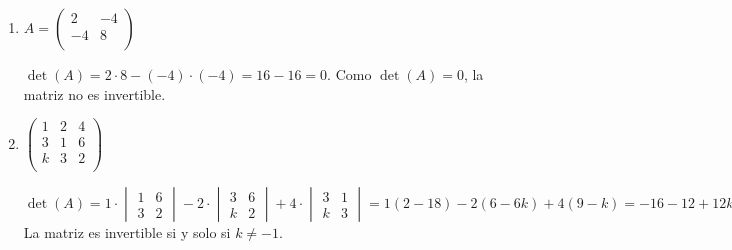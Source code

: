 \begin{prob}
\begin{enumerate}[$a)$]
\begin{myproof}
Por lo tanto:
$A^{-1} = \left( \begin{array}{cccc}
8&3&-5&-1\\
\frac{3}{2}&0&-1&0\\
\frac{1}{2}&0&0&0\\
-8&-2&5&1\\
\end{array} \right)$
 
\end{myproof}

\item $A=\left( \begin{array}{cc}
2&-4\\
-4&8\\
\end{array} \right)$
\begin{myproof} $\det(A) = 2 \cdot 8 - (-4) \cdot (-4) = 16 - 16 = 0.$ Como $\det(A) = 0$, la matriz no es invertible.
\end{myproof}

\item $\left( \begin{array}{ccc}
1&2&4\\
3&1&6\\
k&3&2\\\end{array} \right)$ 

\begin{myproof}

$\det(A) = 1 \cdot \begin{vmatrix} 1&6\\3&2 \end{vmatrix} - 2 \cdot \begin{vmatrix} 3&6\\k&2 \end{vmatrix} + 4 \cdot \begin{vmatrix} 3&1\\k&3 \end{vmatrix}= 1(2-18) - 2(6-6k) + 4(9-k)= -16 - 12 + 12k + 36 - 4k= 8 + 8k = 8(1+k).$ La matriz es invertible si y solo si $k \neq -1$.


\end{myproof}
\end{enumerate}
\end{prob}
